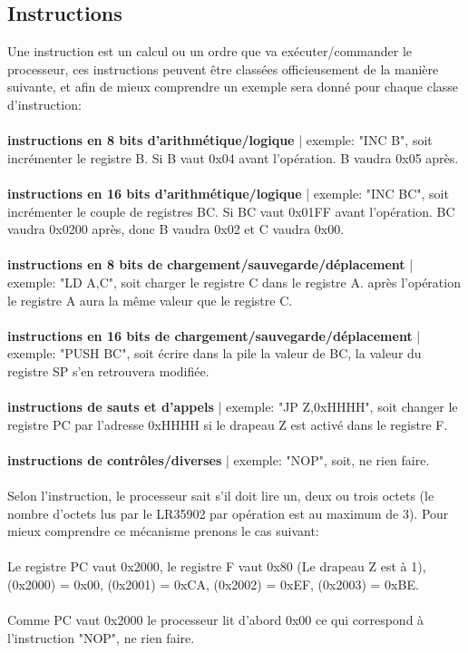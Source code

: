 \documentclass[french]{report}
\begin{document}
\subsection{Instructions}
Une instruction est un calcul ou un ordre que va exécuter/commander le processeur, ces instructions peuvent être classées officieusement de la manière suivante, et afin de mieux comprendre un exemple sera donné pour chaque classe d'instruction:\\\\
\textbf{instructions en 8 bits d'arithmétique/logique} | exemple: "INC B", soit incrémenter le registre B. Si B vaut 0x04 avant l'opération. B vaudra 0x05 après.\\\\
\textbf{instructions en 16 bits d'arithmétique/logique} | exemple: "INC BC", soit incrémenter le couple de registres BC. Si BC vaut 0x01FF avant l'opération. BC vaudra 0x0200 après, donc B vaudra 0x02 et C vaudra 0x00.\\\\
\textbf{instructions en 8 bits de chargement/sauvegarde/déplacement} | exemple: "LD A,C", soit charger le registre C dans le registre A. après l'opération le registre A aura la même valeur que le registre C.\\\\
\textbf{instructions en 16 bits de chargement/sauvegarde/déplacement} | exemple: "PUSH BC", soit écrire dans la pile la valeur de BC, la valeur du registre SP s'en retrouvera modifiée.\\\\
\textbf{instructions de sauts et d'appels} | exemple: "JP Z,0xHHHH", soit changer le registre PC par l'adresse 0xHHHH si le drapeau Z est activé dans le registre F.\\\\
\textbf{instructions de contrôles/diverses} | exemple: "NOP", soit, ne rien faire.\\\\
Selon l'instruction, le processeur sait s'il doit lire un, deux ou trois octets (le nombre d'octets lus par le LR35902 par opération est au maximum de 3). Pour mieux comprendre ce mécanisme prenons le cas suivant:\\\\
Le registre PC vaut 0x2000, le registre F vaut 0x80 (Le drapeau Z est à 1), (0x2000) = 0x00, (0x2001) = 0xCA, (0x2002) = 0xEF, (0x2003) = 0xBE.\\\\
Comme PC vaut 0x2000 le processeur lit d'abord 0x00 ce qui correspond à l'instruction "NOP", ne rien faire. 
\end{document}
